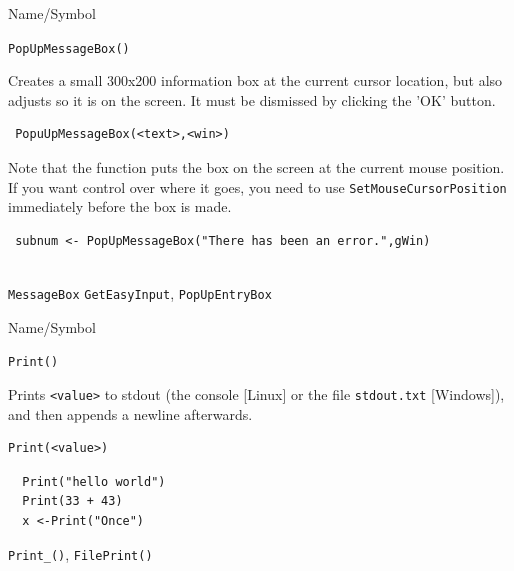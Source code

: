 \begin{desc}{Name/Symbol}
\item[Name/Symbol]	\verb+PopUpMessageBox()+ 

\item[Description]	Creates a small 300x200 information box at the current cursor location, but also adjusts so it is on the screen.  It must be dismissed by clicking the 'OK' button.  

\item[Usage]		
\begin{verbatim}
 PopuUpMessageBox(<text>,<win>)
\end{verbatim}
Note that the function puts the box on the screen at the current mouse position.  If you want control over where it goes, you need to use \verb+SetMouseCursorPosition+ immediately before the box is made.
\item[Example]	
\begin{verbatim}
 subnum <- PopUpMessageBox("There has been an error.",gWin)
 
\end{verbatim}

\item[See Also]     
\verb+MessageBox+ \verb+GetEasyInput+, \verb+PopUpEntryBox+
\end{desc}


\begin{desc}{Name/Symbol}
\item[Name/Symbol]	\verb+Print()+

\item[Description]	Prints \verb+<value>+ to stdout (the console [Linux] or the file \texttt{stdout.txt} [Windows]), and then appends a newline afterwards.

\item[Usage]		
\begin{verbatim}
Print(<value>)
\end{verbatim}

\item[Example]	
\begin{verbatim}
  Print("hello world")
  Print(33 + 43)
  x <-Print("Once")

\end{verbatim}
\item[See Also]	\verb+Print_()+, \verb+FilePrint()+
\end{desc}




